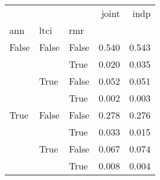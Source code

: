 \begin{tabular}{lllrr}
\toprule
     &      &      &  joint &   indp \\
ann & ltci & rmr &        &        \\
\midrule
False & False & False &  0.540 &  0.543 \\
     &      & True &  0.020 &  0.035 \\
     & True & False &  0.052 &  0.051 \\
     &      & True &  0.002 &  0.003 \\
True & False & False &  0.278 &  0.276 \\
     &      & True &  0.033 &  0.015 \\
     & True & False &  0.067 &  0.074 \\
     &      & True &  0.008 &  0.004 \\
\bottomrule
\end{tabular}
